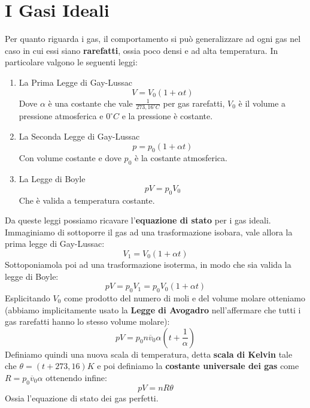 \documentclass{article}
\begin{document}
\section{I Gasi Ideali}
Per quanto riguarda i gas, il comportamento si può generalizzare ad ogni gas nel caso in cui essi siano \textbf{rarefatti}, ossia poco densi e ad alta temperatura. In particolare valgono le seguenti leggi:
\begin{enumerate}
    \item La Prima Legge di Gay-Lussac \[V=V_0(1+\alpha t)\]
    Dove $\alpha$ è una costante che vale $\frac{1}{273,16^\circ C}$ per gas rarefatti, $V_0$ è il volume a pressione atmosferica e $0^\circ C$ e la pressione è costante.
    \item La Seconda Legge di Gay-Lussac \[p=p_0(1+\alpha t)\]
    Con volume costante e dove $p_0$ è la costante atmosferica.
    \item La Legge di Boyle \[pV=p_0V_0\]
    Che è valida a temperatura costante.
\end{enumerate}
Da queste leggi possiamo ricavare l'\textbf{equazione di stato} per i gas ideali. Immaginiamo di sottoporre il gas ad una trasformazione isobara, vale allora la prima legge di Gay-Lussac:
\[V_1=V_0(1+\alpha t)\]
Sottoponiamola poi ad una trasformazione isoterma, in modo che sia valida la legge di Boyle:
\[pV=p_0V_1=p_0V_0(1+\alpha t)\]
Esplicitando $V_0$ come prodotto del numero di moli e del volume molare otteniamo (abbiamo implicitamente usato la \textbf{Legge di Avogadro} nell'affermare che tutti i gas rarefatti hanno lo stesso volume molare):
\[pV=p_0n\overline{v}_0\alpha \left(t+\frac{1}{\alpha}\right)\]
Definiamo quindi una nuova scala di temperatura, detta \textbf{scala di Kelvin} tale che $\theta=(t+273,16)K$ e poi definiamo la \textbf{costante universale dei gas} come $R=p_0\overline{v}_0\alpha$ ottenendo infine:
\begin{equation}
\boxed{pV=nR\theta}
\end{equation}
Ossia l'equazione di stato dei gas perfetti.
\end{document}
